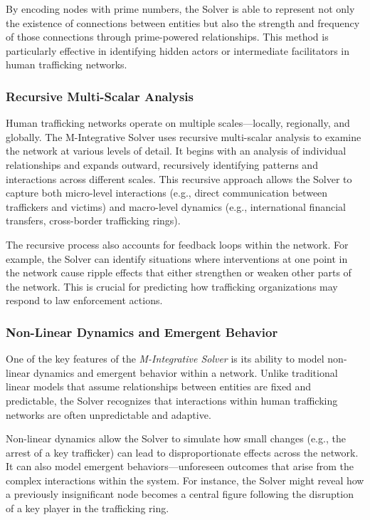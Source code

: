 \documentclass[%
 preprint, linenumbers,
 amsmath,amssymb,
 aps, physrev,
]{revtex4-2}
\begin{document}
By encoding nodes with prime numbers, the Solver is able to represent not only the existence of connections between entities but also the strength and frequency of those connections through prime-powered relationships. This method is particularly effective in identifying hidden actors or intermediate facilitators in human trafficking networks.

\subsubsection{Recursive Multi-Scalar Analysis}
Human trafficking networks operate on multiple scales—locally, regionally, and globally. The M-Integrative Solver uses recursive multi-scalar analysis to examine the network at various levels of detail. It begins with an analysis of individual relationships and expands outward, recursively identifying patterns and interactions across different scales. This recursive approach allows the Solver to capture both micro-level interactions (e.g., direct communication between traffickers and victims) and macro-level dynamics (e.g., international financial transfers, cross-border trafficking rings).

The recursive process also accounts for feedback loops within the network. For example, the Solver can identify situations where interventions at one point in the network cause ripple effects that either strengthen or weaken other parts of the network. This is crucial for predicting how trafficking organizations may respond to law enforcement actions.

\subsubsection{Non-Linear Dynamics and Emergent Behavior}
One of the key features of the \textit{M-Integrative Solver} is its ability to model non-linear dynamics and emergent behavior within a network. Unlike traditional linear models that assume relationships between entities are fixed and predictable, the Solver recognizes that interactions within human trafficking networks are often unpredictable and adaptive.

Non-linear dynamics allow the Solver to simulate how small changes (e.g., the arrest of a key trafficker) can lead to disproportionate effects across the network. It can also model emergent behaviors—unforeseen outcomes that arise from the complex interactions within the system. For instance, the Solver might reveal how a previously insignificant node becomes a central figure following the disruption of a key player in the trafficking ring.
\end{document}
